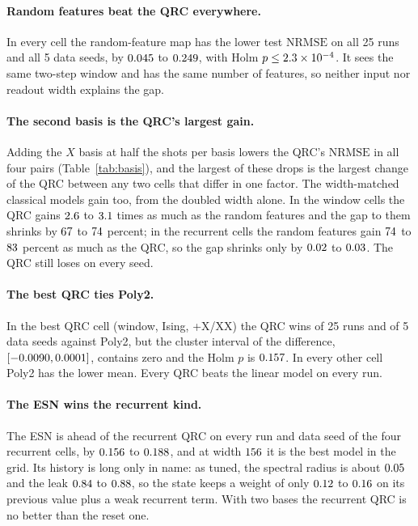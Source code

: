 \documentclass[11pt,a4paper]{article}
\newcommand{\nrmse}{\mathrm{NRMSE}}
\begin{document}
\paragraph{Random features beat the QRC everywhere.} In every cell the random-feature map has the
lower test $\nrmse$ on all 25 runs and all 5 data seeds, by $0.045$ to $0.249$, with Holm
$p\le2.3\times10^{-4}$. It sees the same two-step window and has the same number of features, so neither
input nor readout width explains the gap.

\paragraph{The second basis is the QRC's largest gain.} Adding the $X$ basis at half the shots per
basis lowers the QRC's $\nrmse$ in all four pairs (Table~\ref{tab:basis}), and the largest of these
drops is the largest change of the QRC between any two cells that differ in one factor. The
width-matched classical models gain too, from the doubled width alone. In the window cells the QRC
gains $2.6$ to $3.1$ times as much as the random features and the gap to them
shrinks by $67$ to $74$ percent; in the recurrent cells the random features gain $74$ to
$83$ percent as much as the QRC, so the gap shrinks only by $0.02$ to
$0.03$. The QRC still loses on every seed.

\begin{table}[htbp]
\centering
\caption{Effect of the second basis (same total shots). Columns 3 and 4: QRC test $\nrmse$; columns
5 to 7: change in mean test $\nrmse$ from Z/ZZ to +X/XX for the QRC and the width-matched RF and ESN;
columns 8 and 9: QRC minus RF.}
\label{tab:basis}
\small

\end{table}

\paragraph{The best QRC ties Poly2.} In the best QRC cell (window, Ising, +X/XX) the QRC wins
\bestPolyRunWins{} of 25 runs and \bestPolySeedWins{} of 5 data seeds against Poly2, but the cluster
interval of the difference, $[-0.0090,0.0001]$, contains zero and the Holm $p$ is
$0.157$. In every other cell Poly2 has the lower mean. Every QRC beats the linear model on every
run.

\paragraph{The ESN wins the recurrent kind.} The ESN is ahead of the recurrent QRC on every run and
data seed of the four recurrent cells, by $0.156$ to $0.188$, and at width $156$ it is
the best model in the grid. Its history is long only in name: as tuned, the spectral radius is about
$0.05$ and the leak $0.84$ to $0.88$, so the state keeps a weight of only
$0.12$ to $0.16$ on its previous value plus a weak recurrent term. With two bases the
recurrent QRC is no better than the reset one.
\end{document}

